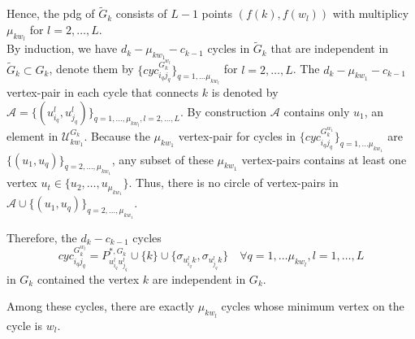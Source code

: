\documentclass[a4paper,12pt]{article}
\numberwithin{equation}{section}
\begin{document}
	Hence, the pdg of $\tilde{G}_k$ consists of $L-1$ points $(f(k),f(w_l))$ with multiplicy $\mu_{kw_l}$ for $l= 2,\ldots,L$.\\
	
	By induction, we have $d_k - \mu_{kw_1} - c_{k-1}$ cycles in $\tilde{G}_k$ that are independent in $\tilde{G}_k \subset G_k$, denote them by $\{cyc_{i_q j_q}^{G^{w_l}_k}\}_{q=1,\ldots \mu_{kw_l}}$ for $l = 2,\ldots,L$. 
	The $d_k - \mu_{kw_1} - c_{k-1}$ vertex-pair in each cycle that connects $k$ is denoted by $\mathcal{A}= \{(u^{l}_{i_q}, u^l_{j_q})\}_{q = 1, \ldots, \mu_{kw_l}, l =2,\ldots, L}$. By construction $\mathcal{A}$ contains only $u_1$, an element in $\mathcal{U}_{kw_1}^{G_k}$. Because the $\mu_{kw_1}$ vertex-pair for cycles in $\{ cyc_{i_q j_q}^{G^{w_1}_k}\}_{q=1,\ldots \mu_{kw_1}}$ are $\{ (u_1,u_q) \}_{q =2,\ldots, \mu_{kw_1}}$, any subset of these $\mu_{kw_1}$ vertex-pairs contains at least one vertex $u_t \in \{u_2,\ldots,u_{\mu_{kw_1}} \}$. Thus, there is no circle of vertex-pairs in $\mathcal{A} \cup \{ (u_1,u_q) \}_{q =2,\ldots, \mu_{kw_1}}$. 
	
	Therefore, the $d_k - c_{k-1}$ cycles
	$$ cyc_{i_q j_q}^{G^{w_l}_k} = P_{u^l_{i_q} u^l_{j_q}}^{*,G_k} \cup \{k\} \cup \{ \sigma_{u^l_{i_q} k}, \sigma_{u^l_{j_q} k} \} \quad  \forall q=1,\ldots \mu_{kw_l}, l =1,\ldots,L$$
	in $G_k$ contained the vertex $k$ are independent in $G_k$. 
	
	
	Among these cycles, there are exactly $\mu_{kw_l}$ cycles whose minimum vertex on the cycle is $w_l$.\\
	
	
	
	
	
	
	
	
\end{document}
